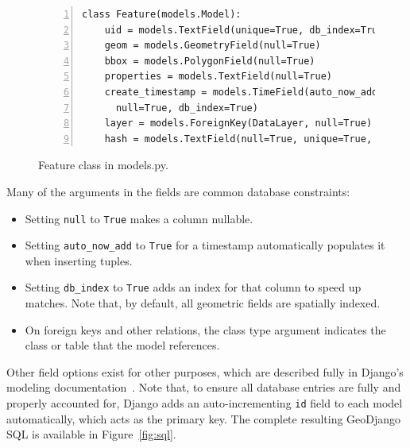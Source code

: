 \begin{figure}
\begin{Verbatim}[samepage=true,baselinestretch=1,numbers=left,xleftmargin=12mm]
class Feature(models.Model):
    uid = models.TextField(unique=True, db_index=True)
    geom = models.GeometryField(null=True)
    bbox = models.PolygonField(null=True)
    properties = models.TextField(null=True)
    create_timestamp = models.TimeField(auto_now_add=True,
      null=True, db_index=True)
    layer = models.ForeignKey(DataLayer, null=True)
    hash = models.TextField(null=True, unique=True, db_index=True)
\end{Verbatim}
\caption{Feature class in models.py.}
\label{fig:feature}
\end{figure}


Many of the arguments in the fields are common database constraints:
\begin{itemize}
\item Setting \texttt{null} to \texttt{True} makes a column nullable.
\item Setting \texttt{auto\_now\_add} to \texttt{True} for a timestamp automatically populates it when inserting tuples.
\item Setting \texttt{db\_index} to \texttt{True} adds an index for that column to speed up matches. Note that, by default, all geometric fields are spatially indexed.
\item On foreign keys and other relations, the class type argument indicates the class or table that the model references.
\end{itemize}

Other field options exist for other purposes, which are described fully in Django's modeling documentation~\cite{Models}.  Note that, to ensure all database entries are fully and properly accounted for, Django adds an auto-incrementing \texttt{id} field to each model automatically, which acts as the primary key. The complete resulting GeoDjango SQL is available in Figure~\ref{fig:sql}.



